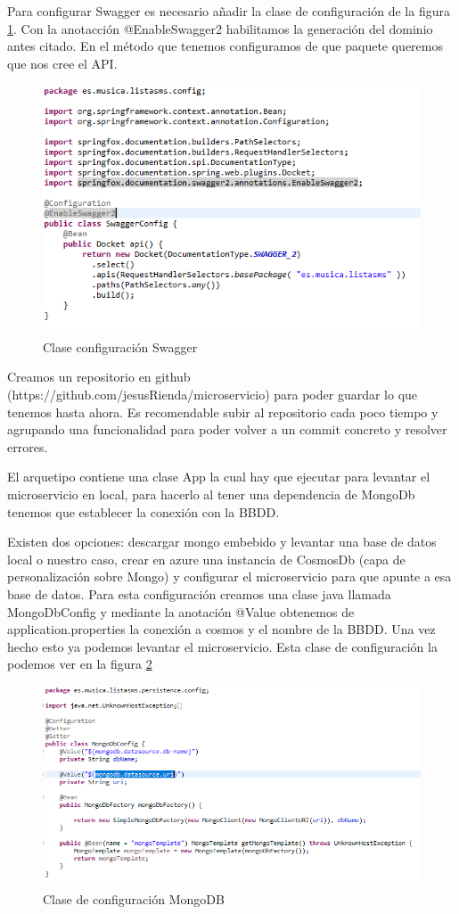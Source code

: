\documentclass[12pt]{report} %
\begin{document}
Para configurar Swagger es necesario añadir la clase de configuración de la figura \ref{fig:cofingswagger}. Con la anotacción @EnableSwagger2 habilitamos la generación del dominio antes citado. En el método que tenemos configuramos de que paquete queremos que nos cree el API.

\begin{figure}
	\centering
	\includegraphics[width=0.7\linewidth]{imagenes/cofingSwagger}
	\caption{Clase configuración Swagger}
	\label{fig:cofingswagger}
\end{figure}


Creamos un repositorio en github (https://github.com/jesusRienda/microservicio) para poder guardar lo que tenemos hasta ahora. Es recomendable subir al repositorio cada poco tiempo y agrupando una funcionalidad para poder volver a un commit concreto y resolver errores.

El arquetipo contiene una clase App la cual hay que ejecutar para levantar el microservicio en local, para hacerlo al tener una dependencia de MongoDb tenemos que establecer la conexión con la BBDD.

 Existen dos opciones: descargar mongo embebido y levantar una base de datos local o nuestro caso, crear en azure una instancia de CosmosDb (capa de personalización sobre Mongo) y configurar el microservicio para que apunte a esa base de datos. Para esta configuración creamos una clase java llamada MongoDbConfig y mediante la anotación @Value obtenemos de application.properties la conexión a cosmos y el nombre de la BBDD. Una vez hecho esto ya podemos levantar el microservicio. Esta clase de configuración la podemos ver en la figura \ref{fig:configmongo}

\begin{figure}
	\centering
	\includegraphics[width=0.7\linewidth]{imagenes/configMongo}
	\caption{Clase de configuración MongoDB}
	\label{fig:configmongo}
\end{figure}
\end{document}
